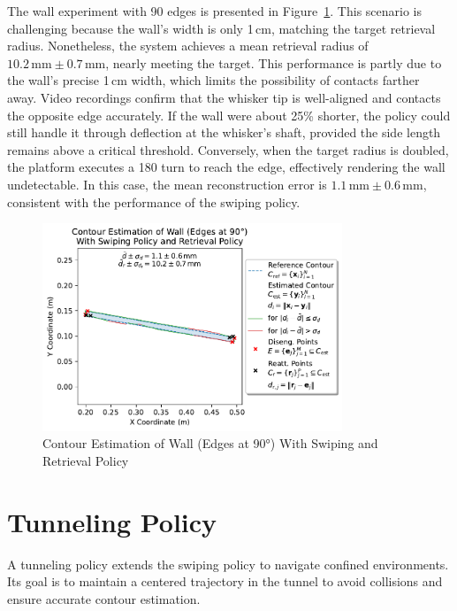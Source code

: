 The wall experiment with 90\degree{} edges is presented in Figure~\ref{fig:experiment-wall-edges-90deg-swiping-retrieval}.
This scenario is challenging because the wall’s width is only 1\,cm, matching the target retrieval radius.
Nonetheless, the system achieves a mean retrieval radius of $10.2\,\text{mm} \pm 0.7\,\text{mm}$, nearly meeting the target.
This performance is partly due to the wall’s precise 1\,cm width, which limits the possibility of contacts farther away.
Video recordings confirm that the whisker tip is well-aligned and contacts the opposite edge accurately.
If the wall were about 25\% shorter, the policy could still handle it through deflection at the whisker’s shaft, provided the side length remains above a critical threshold.
Conversely, when the target radius is doubled, the platform executes a 180\degree{} turn to reach the edge, effectively rendering the wall undetectable.
In this case, the mean reconstruction error is $1.1\,\text{mm} \pm 0.6\,\text{mm}$, consistent with the performance of the swiping policy.

\begin{figure}[!htb]
    \centering
    \includegraphics[width=0.8\textwidth]{figures/experiments/wall-edges-90deg-swiping-retrieval}
    \caption{Contour Estimation of Wall (Edges at 90°) With Swiping and Retrieval Policy}
    \label{fig:experiment-wall-edges-90deg-swiping-retrieval}
\end{figure}


\section{Tunneling Policy}
A tunneling policy extends the swiping policy to navigate confined environments.
Its goal is to maintain a centered trajectory in the tunnel to avoid collisions and ensure accurate contour estimation.

